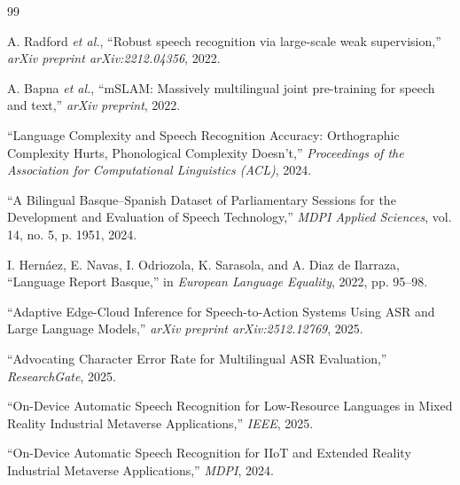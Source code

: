 \documentclass[12pt]{article}
\begin{document}
\begin{thebibliography}{99}

A. Radford \textit{et al.}, ``Robust speech recognition via large-scale weak supervision,'' \textit{arXiv preprint arXiv:2212.04356}, 2022.

A. Bapna \textit{et al.}, ``mSLAM: Massively multilingual joint pre-training for speech and text,'' \textit{arXiv preprint}, 2022.

``Language Complexity and Speech Recognition Accuracy: Orthographic Complexity Hurts, Phonological Complexity Doesn't,'' \textit{Proceedings of the Association for Computational Linguistics (ACL)}, 2024.

``A Bilingual Basque–Spanish Dataset of Parliamentary Sessions for the Development and Evaluation of Speech Technology,'' \textit{MDPI Applied Sciences}, vol. 14, no. 5, p. 1951, 2024.

I. Hernáez, E. Navas, I. Odriozola, K. Sarasola, and A. Diaz de Ilarraza, ``Language Report Basque,'' in \textit{European Language Equality}, 2022, pp. 95--98.

``Adaptive Edge-Cloud Inference for Speech-to-Action Systems Using ASR and Large Language Models,'' \textit{arXiv preprint arXiv:2512.12769}, 2025.

``Advocating Character Error Rate for Multilingual ASR Evaluation,'' \textit{ResearchGate}, 2025.

``On-Device Automatic Speech Recognition for Low-Resource Languages in Mixed Reality Industrial Metaverse Applications,'' \textit{IEEE}, 2025.

``On-Device Automatic Speech Recognition for IIoT and Extended Reality Industrial Metaverse Applications,'' \textit{MDPI}, 2024.

\end{thebibliography}
\end{document}
